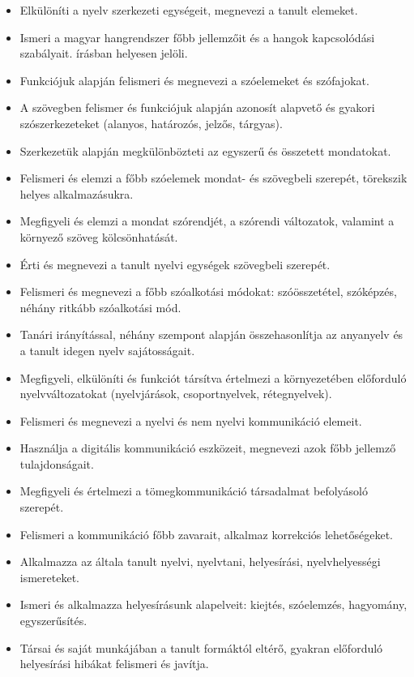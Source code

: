 \begin{itemize}
\item
  Elkülöníti a nyelv szerkezeti egységeit, megnevezi a tanult elemeket.
\item
  Ismeri a magyar hangrendszer főbb jellemzőit és a hangok kapcsolódási
  szabályait. írásban helyesen jelöli.
\item
  Funkciójuk alapján felismeri és megnevezi a szóelemeket és szófajokat.
\item
  A szövegben felismer és funkciójuk alapján azonosít alapvető és
  gyakori szószerkezeteket (alanyos, határozós, jelzős, tárgyas).
\item
  Szerkezetük alapján megkülönbözteti az egyszerű és összetett
  mondatokat.
\item
  Felismeri és elemzi a főbb szóelemek mondat- és szövegbeli szerepét,
  törekszik helyes alkalmazásukra.
\item
  Megfigyeli és elemzi a mondat szórendjét, a szórendi változatok,
  valamint a környező szöveg kölcsönhatását.
\item
  Érti és megnevezi a tanult nyelvi egységek szövegbeli szerepét.
\item
  Felismeri és megnevezi a főbb szóalkotási módokat: szóösszetétel,
  szóképzés, néhány ritkább szóalkotási mód.
\item
  Tanári irányítással, néhány szempont alapján összehasonlítja az
  anyanyelv és a tanult idegen nyelv sajátosságait.
\item
  Megfigyeli, elkülöníti és funkciót társítva értelmezi a környezetében
  előforduló nyelvváltozatokat (nyelvjárások, csoportnyelvek,
  rétegnyelvek).
\item
  Felismeri és megnevezi a nyelvi és nem nyelvi kommunikáció elemeit.
\item
  Használja a digitális kommunikáció eszközeit, megnevezi azok főbb
  jellemző tulajdonságait.
\item
  Megfigyeli és értelmezi a tömegkommunikáció társadalmat befolyásoló
  szerepét.
\item
  Felismeri a kommunikáció főbb zavarait, alkalmaz korrekciós
  lehetőségeket.
\item
  Alkalmazza az általa tanult nyelvi, nyelvtani, helyesírási,
  nyelvhelyességi ismereteket.
\item
  Ismeri és alkalmazza helyesírásunk alapelveit: kiejtés, szóelemzés,
  hagyomány, egyszerűsítés.
\item
  Társai és saját munkájában a tanult formáktól eltérő, gyakran
  előforduló helyesírási hibákat felismeri és javítja.

\end{itemize}
